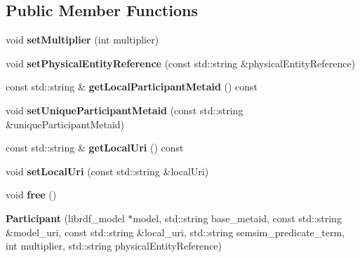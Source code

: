 \subsection*{Public Member Functions}
\begin{DoxyCompactItemize}
\item 
\mbox{\label{classomexmeta_1_1Participant_a97c047d67dc86db1e617c3528bf8035e}} 
void {\bfseries set\+Multiplier} (int multiplier)
\item 
\mbox{\label{classomexmeta_1_1Participant_a415c1205762dff6943426d830d74edcd}} 
void {\bfseries set\+Physical\+Entity\+Reference} (const std\+::string \&physical\+Entity\+Reference)
\item 
\mbox{\label{classomexmeta_1_1Participant_a8a6626e17aca48b76465d66928eee78f}} 
const std\+::string \& {\bfseries get\+Local\+Participant\+Metaid} () const
\item 
\mbox{\label{classomexmeta_1_1Participant_a5e8f680950f55230587c0f85498c5047}} 
void {\bfseries set\+Unique\+Participant\+Metaid} (const std\+::string \&unique\+Participant\+Metaid)
\item 
\mbox{\label{classomexmeta_1_1Participant_a6bf4c724ab5212d10f2a89893f369cd1}} 
const std\+::string \& {\bfseries get\+Local\+Uri} () const
\item 
\mbox{\label{classomexmeta_1_1Participant_a595323ae0681f42a7ba5981e2ee840f1}} 
void {\bfseries set\+Local\+Uri} (const std\+::string \&local\+Uri)
\item 
\mbox{\label{classomexmeta_1_1Participant_a395bc8d2561149a77371ed80e2ed1517}} 
void {\bfseries free} ()
\item 
\mbox{\label{classomexmeta_1_1Participant_a95c8c86650d1b0d31bb47eb618ff81b9}} 
{\bfseries Participant} (librdf\+\_\+model $\ast$model, std\+::string base\+\_\+metaid, const std\+::string \&model\+\_\+uri, const std\+::string \&local\+\_\+uri, std\+::string semsim\+\_\+predicate\+\_\+term, int multiplier, std\+::string physical\+Entity\+Reference)

\end{DoxyCompactItemize}
